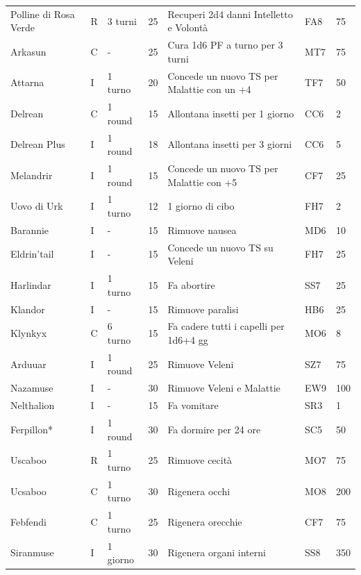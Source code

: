 \documentclass[a4paper,11pt,twoside,openany]{book}
\begin{document}
\begin{longtable}{|L{3.2cm} |k{0.7cm} |k{1.7cm}| D{1cm} |L{5cm} |k{1.5cm} |k{1cm}|}
	Polline di Rosa Verde& R  & 3 turni   & 25& Recuperi 2d4 danni Intelletto e Volontà  & FA8 & 75   \\
	Arkasun   & C  & -    & 25& Cura 1d6 PF a turno per 3 turni& MT7 & 75   \\
	Attarna   & I  & 1 turno   & 20& Concede un nuovo TS per Malattie con un +4    & TF7 & 50   \\
	Delrean   & C  & 1 round   & 15& Allontana insetti per 1 giorno & CC6 & 2    \\
	Delrean Plus   & I  & 1 round   & 18& Allontana insetti per 3 giorni & CC6 & 5    \\
	Melandrir    & I  & 1 round   & 15& Concede un nuovo TS per Malattie con +5  & CF7 & 25   \\
	Uovo di Urk& I  & 1 turno   & 12& 1 giorno di cibo& FH7 & 2    \\
	Barannie & I  & -    & 15& Rimuove nausea   & MD6 & 10   \\
	Eldrin'tail& I  & -    & 15& Concede un nuovo TS su Veleni  & FH7 & 25   \\
	Harlindar    & I  & 1 turno   & 15& Fa abortire& SS7 & 25   \\
	Klandor   & I  & -    & 15& Rimuove paralisi& HB6 & 25   \\
	Klynkyx   & C  & 6 turno   & 15& Fa cadere tutti i capelli per 1d6+4 gg   & MO6 & 8    \\
	Arduuar   & I  & 1 round   & 25& Rimuove Veleni  & SZ7 & 75   \\
	Nazamuse & I  & -    & 30& Rimuove Veleni e Malattie & EW9 & 100  \\
	Nelthalion  & I  & -    & 15& Fa vomitare& SR3 & 1    \\
	Ferpillon{*} & I  & 1 round   & 30& Fa dormire per 24 ore& SC5 & 50   \\
	Uscaboo   & R  & 1 turno   & 25& Rimuove cecità  & MO7 & 75   \\
	Ucsaboo   & C  & 1 turno   & 30& Rigenera occhi  & MO8 & 200  \\
	Febfendi & C  & 1 turno   & 25& Rigenera orecchie    & CF7 & 75   \\
	Siranmuse    & I  & 1 giorno  & 30& Rigenera organi interni   & SS8 & 350  \\

\end{longtable}
\end{document}
